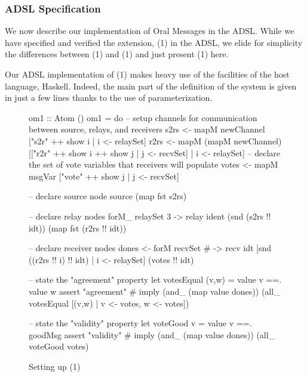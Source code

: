 
\subsubsection{ADSL Specification}

We now describe our implementation of Oral Messages in the ADSL. While we have specified
and verified the extension, \OMH(1) in the ADSL, we elide for simplicity the
differences between \OMH(1) and \OM(1) and just present \OM(1) here.

Our ADSL implementation of \OM(1) makes heavy use of the facilities of the
host language, Haskell. Indeed, the main part of the definition of the system
is given in just a few lines thanks to the use of parameterization.

\begin{figure}
\begin{lima}
om1 :: Atom ()
om1 = do
  -- setup channels for communication between source, relays, and receivers
  s2rs <- mapM newChannel ["s2r" ++ show i | i <- relaySet]
  r2rs <- mapM (mapM newChannel) [["r2r" ++ show i ++ show j | j <- recvSet]
                                                             | i <- relaySet]
  -- declare the set of vote variables that receivers will populate
  votes <- mapM msgVar ["vote" ++ show j | j <- recvSet]

  -- declare source node
  source (map fst s2rs)

  -- declare relay nodes
  forM_ relaySet 3 \idt ->
    relay ident (snd (s2rs !! idt))
                (map fst (r2rs !! idt))

  -- declare receiver nodes
  dones <- forM recvSet # \idt ->
    recv idt [snd ((r2rs !! i) !! idt) | i <- relaySet] (votes !! idt)

  -- state the "agreement" property
  let votesEqual (v,w) = value v ==. value w
  assert "agreement" # imply (and_ (map value dones))
                             (all_ votesEqual
                                   [(v,w) | v <- votes, w <- votes])

  -- state the "validity" property
  let voteGood v = value v ==. goodMsg
  assert "validity" # imply (and_ (map value dones)) (all_ voteGood votes)
\end{lima}
\caption{Setting up \OM(1)}
\label{fig:om1-setup}
\end{figure}

